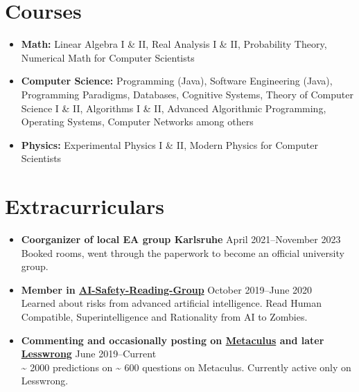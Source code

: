 \documentclass[letterpaper,10pt]{article}
\begin{document}
\section*{Courses}
\begin{itemize}
    \item \textbf{Math:} Linear Algebra I \& II, Real Analysis I \& II, Probability Theory, Numerical Math for Computer Scientists
    \item \textbf{Computer Science:} Programming (Java), Software Engineering (Java), Programming Paradigms, Databases, Cognitive Systems, Theory of Computer Science I \& II, Algorithms I \& II, Advanced Algorithmic Programming, Operating Systems, Computer Networks among others
    \item \textbf{Physics:} Experimental Physics I \& II, Modern Physics for Computer Scientists
\end{itemize}

\unless\ifdefined\EAVersion
\section*{Extracurriculars}
  \begin{itemize}
      \item {\textbf{Coorganizer of local EA group Karlsruhe}} \hfill April 2021--November 2023 \\
      {Booked rooms, went through the paperwork to become an official university group.}
      \item {\textbf{Member in \href{https://web.archive.org/web/20220123065219/http://aisafety.com/}{AI-Safety-Reading-Group}}} \hfill October 2019--June 2020 \\
      {Learned about risks from advanced artificial intelligence. Read Human Compatible, Superintelligence and Rationality from AI to Zombies.}
      \item {\textbf{Commenting and occasionally posting on \href{https://www.metaculus.com/accounts/profile/106992/}{Metaculus} and later \href{https://www.lesswrong.com/users/morpheus}{Lesswrong}}} \hfill June 2019--Current \\
      {\textasciitilde{} 2000 predictions on \textasciitilde{} 600 questions on Metaculus. Currently active only on Lesswrong.}
  \end{itemize}
\fi
\end{document}
